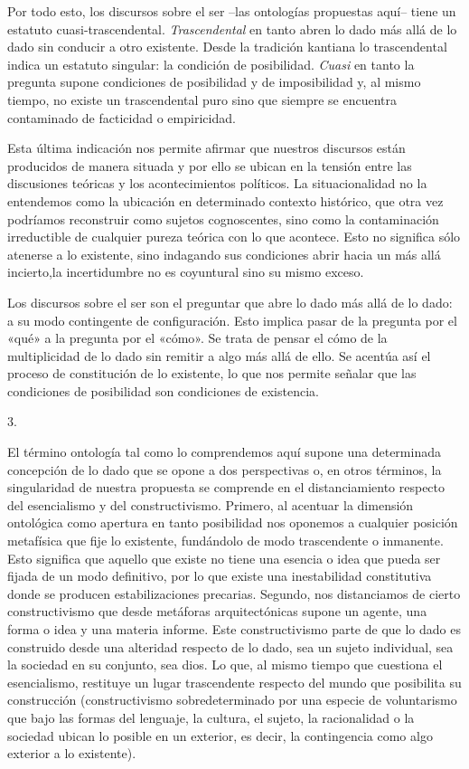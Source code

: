 Por todo esto, los discursos sobre el ser --las ontologías propuestas aquí-- tiene un estatuto cuasi-trascendental. \emph{Trascendental} en tanto abren lo dado más allá de lo dado sin conducir a otro existente. Desde la tradición kantiana lo trascendental indica un estatuto singular: la condición de posibilidad. \emph{Cuasi} en tanto la pregunta supone condiciones de posibilidad y de imposibilidad y, al mismo tiempo, no existe un trascendental puro sino que siempre se encuentra contaminado de facticidad o empiricidad.

Esta última indicación nos permite afirmar que nuestros discursos están producidos de manera situada y por ello se ubican en la tensión entre las discusiones teóricas y los acontecimientos políticos. La situacionalidad no la entendemos como la ubicación en determinado contexto histórico, que otra vez podríamos reconstruir como sujetos cognoscentes, sino como la contaminación irreductible de cualquier pureza teórica con lo que acontece. Esto no significa sólo atenerse a lo existente, sino indagando sus condiciones abrir hacia un más allá incierto,la incertidumbre no es coyuntural sino su mismo exceso.

Los discursos sobre el ser son el preguntar que abre lo dado más allá de lo dado: a su modo contingente de configuración. Esto implica pasar de la pregunta por el «qué» a la pregunta por el «cómo». Se trata de pensar el cómo de la multiplicidad de lo dado sin remitir a algo más allá de ello. Se acentúa así el proceso de constitución de lo existente, lo que nos permite señalar que las condiciones de posibilidad son condiciones de existencia.

3.

El término ontología tal como lo comprendemos aquí supone una determinada concepción de lo dado que se opone a dos perspectivas o, en otros términos, la singularidad de nuestra propuesta se comprende en el distanciamiento respecto del esencialismo y del constructivismo. Primero, al acentuar la dimensión ontológica como apertura en tanto posibilidad nos oponemos a cualquier posición metafísica que fije lo existente, fundándolo de modo trascendente o inmanente. Esto significa que aquello que existe no tiene una esencia o idea que pueda ser fijada de un modo definitivo, por lo que existe una inestabilidad constitutiva donde se producen estabilizaciones precarias. Segundo, nos distanciamos de cierto constructivismo que desde metáforas arquitectónicas supone un agente, una forma o idea y una materia informe. Este constructivismo parte de que lo dado es construido desde una alteridad respecto de lo dado, sea un sujeto individual, sea la sociedad en su conjunto, sea dios. Lo que, al mismo tiempo que cuestiona el esencialismo, restituye un lugar trascendente respecto del mundo que posibilita su construcción (constructivismo sobredeterminado por una especie de voluntarismo que bajo las formas del lenguaje, la cultura, el sujeto, la racionalidad o la sociedad ubican lo posible en un exterior, es decir, la contingencia como algo exterior a lo existente).

